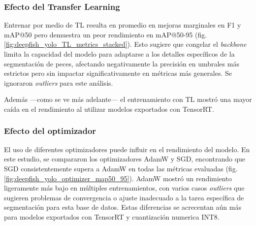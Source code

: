 \subsubsection{Efecto del Transfer Learning}
Entrenar por medio de TL resulta en promedio en mejoras marginales en F1 y mAP@50 pero demuestra un peor rendimiento en mAP@50-95 (fig. \ref{fig:deepfish_yolo_TL_metrics_stacked}). Esto sugiere que congelar el \textit{backbone} limita la capacidad del modelo para adaptarse a los detalles específicos de la segmentación de peces, afectando negativamente la precisión en umbrales más estrictos pero sin impactar significativamente en métricas más generales. Se ignoraron \textit{outliers} para este análisis.

Además ---como se ve más adelante--- el entrenamiento con TL mostró una mayor caída en el rendimiento al utilizar modelos exportados con TensorRT.

\subsubsection{Efecto del optimizador}
El uso de diferentes optimizadores puede influir en el rendimiento del modelo. En este estudio, se compararon los optimizadores AdamW y SGD, encontrando que SGD consistentemente supera a AdamW en todas las métricas evaluadas (fig. \ref{fig:deepfish_yolo_optimizer_map50_95}). AdamW mostró un rendimiento ligeramente más bajo en múltiples entrenamientos, con varios casos \textit{outliers} que sugieren problemas de convergencia o ajuste inadecuado a la tarea específica de segmentación para esta base de datos. Estas diferencias se acrecentan aún más para modelos exportados con TensorRT y cuantización numerica INT8.


